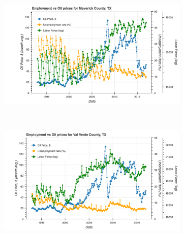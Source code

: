 \documentclass[11pt,letterpaper]{article}
\begin{document}
\begin{figure}
\centering
\begin{subfigure}{0.45\textwidth}
\includegraphics[width=1.1\linewidth]{tx_maverick_oil_price}
\end{subfigure}
~
\begin{subfigure}{0.45\textwidth}
\includegraphics[width=1.1\linewidth]{tx_valverde_oil_price}
\end{subfigure}


\end{figure}
\end{document}
